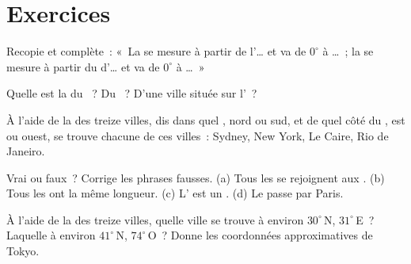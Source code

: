 \section{Exercices}

\begin{exercise}[$\star$]\label{exo:g6:latitude-longitude:1}
Recopie et complète~: «~La  se mesure à partir de l'\ldots{} et va
de $0^\circ$ à \ldots~; la  se mesure à partir du 
d'\ldots{} et va de $0^\circ$ à \ldots~»
\end{exercise}

\begin{exercise}[$\star$]\label{exo:g6:latitude-longitude:2}
Quelle est la  du ~? Du ~? D'une ville située sur
l'~?
\end{exercise}

\begin{exercise}[$\star$]\label{exo:g6:latitude-longitude:3}
À l'aide de la  des treize villes, dis dans quel , nord ou
sud, et de quel côté du , est ou ouest, se trouve chacune
de ces villes~: Sydney, New York, Le Caire, Rio de Janeiro.
\end{exercise}

\begin{exercise}[$\star$]\label{exo:g6:latitude-longitude:4}
Vrai ou faux~? Corrige les phrases fausses.
(a) Tous les  se rejoignent aux .
(b) Tous les  ont la même longueur.
(c) L' est un .
(d) Le  passe par Paris.
\end{exercise}

\begin{exercise}[$\star\star$]\label{exo:g6:latitude-longitude:5}
À l'aide de la  des treize villes, quelle ville se trouve à environ
$30^\circ$\,N, $31^\circ$\,E~? Laquelle à environ $41^\circ$\,N,
$74^\circ$\,O~? Donne les coordonnées approximatives de Tokyo.
\end{exercise}

